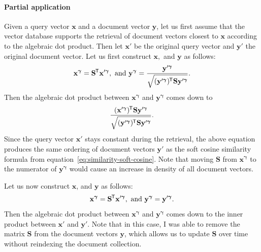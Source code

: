 \documentclass[
  digital, %
  notable, %
  lof,     %
  lot,     %
  nopalatino, color
]{fithesis3}
\newcommand*{\tran}{^{\mkern-1.5mu\mathsf{T}}}
\begin{document}
\paragraph{Partial application} Given a query vector $\mathbf x$ and a
document vector $\mathbf y$, let us first assume that the vector database
supports the retrieval of document vectors closest to $\mathbf x$ according to
the algebraic dot product. Then let $\mathbf x'$ be the original query vector and
$\mathbf y'$ the original document vector. Let us first construct $\mathbf x,$
and $\mathbf y$ as follows:
\begin{equation*}
  \mathbf x^{\bm\gamma} = \mathbf S\tran\mathbf x'^{\bm\gamma},\text{ and }
  \mathbf y^{\bm\gamma} = \frac{\mathbf y'^{\bm\gamma}}{\sqrt{\strut(\mathbf y'^{\bm\gamma})\tran\mathbf S\mathbf y'^{\bm\gamma}}}.
\end{equation*}
Then the algebraic dot product between $\mathbf x^{\bm\gamma}$ and $\mathbf
y^{\bm\gamma}$ comes down to
\begin{equation*}
  \frac{(\mathbf x'^{\bm\gamma})\tran\mathbf S\mathbf y'^{\bm\gamma}}{\sqrt{\strut(\mathbf y'^{\bm\gamma})\tran\mathbf S\mathbf y'^{\bm\gamma}}}.
\end{equation*}
Since the query vector $\mathbf x'$ stays constant during the retrieval, the above
equation produces the same ordering of document vectors $\mathbf y'$ as the soft
cosine similarity formula from equation~\ref{eq:similarity-soft-cosine}. Note that
moving $\mathbf S$ from $\mathbf x^{\bm\gamma}$ to the numerator of
$\mathbf y^{\bm\gamma}$ would cause an increase in density of all document vectors.

Let us now construct $\mathbf x$, and $\mathbf y$ as follows:
\begin{equation*}
  \mathbf x^{\bm\gamma} = \mathbf S\tran\mathbf x'^{\bm\gamma},\text{ and }
  \mathbf y^{\bm\gamma} = \mathbf y'^{\bm\gamma}.
\end{equation*}
Then the algebraic dot product between $\mathbf x^{\bm\gamma}$ and $\mathbf
y^{\bm\gamma}$ comes down to the inner product between $\mathbf x'$ and
$\mathbf y'$. Note that in this case, I was able to remove the matrix
$\mathbf S$ from the document vectors $\mathbf y$, which allows us to update
$\mathbf S$ over time without reindexing the document
collection.
\end{document}
